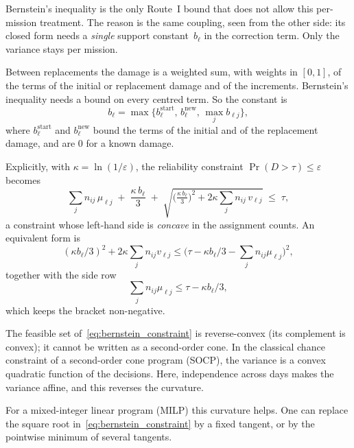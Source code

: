 \documentclass[11pt,a4paper]{article}
\theoremstyle{plain}
\theoremstyle{definition}
\theoremstyle{remark}
\begin{document}
Bernstein's inequality is the only Route~I bound that does not allow this per-mission treatment.
The reason is the same coupling, seen from the other side: its closed form needs a \emph{single} support constant~$b_\ell$ in the correction term.
Only the variance stays per mission.

Between replacements the damage is a weighted sum, with weights in $[0,1]$, of the terms of the initial or replacement damage and of the increments.
Bernstein's inequality needs a bound on every centred term.
So the constant is
\begin{equation}
  b_\ell = \max\{b^{\mathrm{start}}_\ell,\, b^{\mathrm{new}}_\ell,\, \max_j b_{\ell j}\},
\end{equation}
where $b^{\mathrm{start}}_\ell$ and $b^{\mathrm{new}}_\ell$ bound the terms of the initial and of the replacement damage, and are $0$ for a known damage.

Explicitly, with $\kappa = \ln(1/\varepsilon)$, the reliability constraint $\Pr(D > \tau) \le \varepsilon$ becomes
\begin{equation}\label{eq:bernstein_constraint}
  \sum_j n_{ij}\,\mu_{\ell j}
  \;+\; \frac{\kappa\, b_\ell}{3}
  \;+\; \sqrt{ \Big( \tfrac{\kappa\, b_\ell}{3} \Big)^2 + 2\kappa \sum_j n_{ij}\, v_{\ell j} }
  \;\le\; \tau,
\end{equation}
a constraint whose left-hand side is \emph{concave} in the assignment counts.
An equivalent form is
\begin{equation}
  (\kappa b_\ell/3)^2 + 2\kappa\sum_j n_{ij} v_{\ell j} \le \Big(\tau - \kappa b_\ell/3 - \sum_j n_{ij}\mu_{\ell j}\Big)^2,
\end{equation}
together with the side row
\begin{equation}
  \sum_j n_{ij}\mu_{\ell j} \le \tau - \kappa b_\ell/3,
\end{equation}
which keeps the bracket non-negative.

The feasible set of~\eqref{eq:bernstein_constraint} is reverse-convex (its complement is convex); it cannot be written as a second-order cone.
In the classical chance constraint of a second-order cone program (SOCP), the variance is a convex quadratic function of the decisions.
Here, independence across days makes the variance affine, and this reverses the curvature.

For a mixed-integer linear program (MILP) this curvature helps.
One can replace the square root in~\eqref{eq:bernstein_constraint} by a fixed tangent, or by the pointwise minimum of several tangents.
\end{document}
